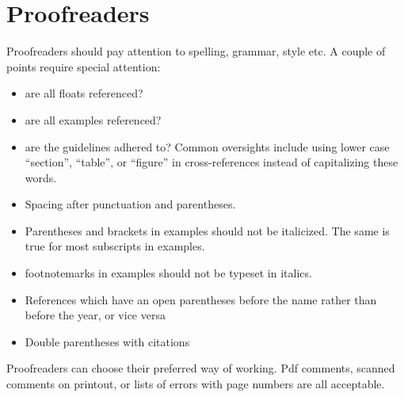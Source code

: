 \chapter{Proofreaders}
Proofreaders should pay attention to spelling, grammar, style etc. A couple of points require special attention:
\begin{itemize}
 \item are all floats referenced?
 \item are all examples referenced?
 \item are the guidelines adhered to? Common oversights include using 
        lower case ``section'', ``table'', or ``figure'' in cross-references instead of capitalizing these words. 
 \item Spacing after punctuation and parentheses.
 \item Parentheses and brackets in examples should not be italicized. The same is true for most subscripts in examples.
 \item footnotemarks in examples should not be typeset in italics.
 \item References which have an open parentheses before the name rather than before the year, or vice versa
 \item Double parentheses with citations
\end{itemize}

Proofreaders can choose their preferred way of working. Pdf comments, scanned comments on printout, or lists of errors with page numbers are all acceptable.








